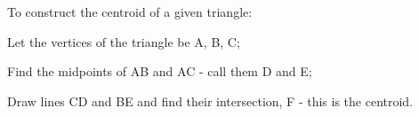 To construct the centroid of a given triangle:
\par
Let the vertices of the triangle be A, B, C;
\par
Find the midpoints of AB and AC - call them D and E;
\par
Draw lines CD and BE and find their intersection, F - this is the centroid.